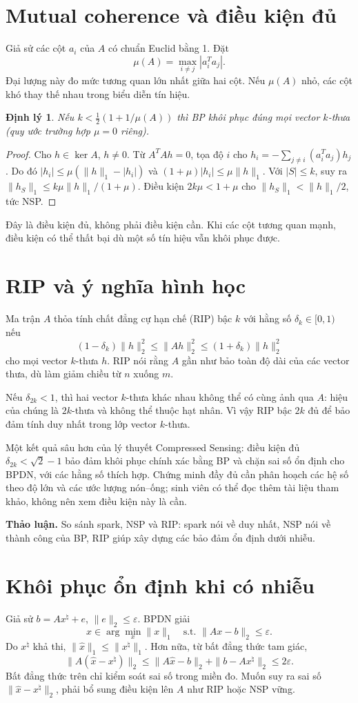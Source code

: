 \documentclass[12pt,a4paper]{article}
\newtheorem{theorem}{Định lý}[section]\newtheorem{lemma}[theorem]{Bổ đề}
\begin{document}
\section{Mutual coherence và điều kiện đủ}
Giả sử các cột $a_i$ của $A$ có chuẩn Euclid bằng 1. Đặt
\[\mu(A)=\max_{i\ne j}|a_i^Ta_j|.\]
Đại lượng này đo mức tương quan lớn nhất giữa hai cột. Nếu $\mu(A)$ nhỏ, các cột khó thay thế nhau trong biểu diễn tín hiệu.

\begin{theorem}Nếu $k<\frac12(1+1/\mu(A))$ thì BP khôi phục đúng mọi vector $k$-thưa (quy ước trường hợp $\mu=0$ riêng).\end{theorem}
\begin{proof}Cho $h\in\ker A$, $h\ne0$. Từ $A^TAh=0$, tọa độ $i$ cho $h_i=-\sum_{j\ne i}(a_i^Ta_j)h_j$. Do đó $|h_i|\le\mu(\|h\|_1-|h_i|)$ và $(1+\mu)|h_i|\le\mu\|h\|_1$. Với $|S|\le k$, suy ra $\|h_S\|_1\le k\mu\|h\|_1/(1+\mu)$. Điều kiện $2k\mu<1+\mu$ cho $\|h_S\|_1<\|h\|_1/2$, tức NSP.\end{proof}

Đây là điều kiện đủ, không phải điều kiện cần. Khi các cột tương quan mạnh, điều kiện có thể thất bại dù một số tín hiệu vẫn khôi phục được.
\clearpage
\section{RIP và ý nghĩa hình học}
Ma trận $A$ thỏa tính chất đẳng cự hạn chế (RIP) bậc $k$ với hằng số $\delta_k\in[0,1)$ nếu
\[(1-\delta_k)\|h\|_2^2\le\|Ah\|_2^2\le(1+\delta_k)\|h\|_2^2\]
cho mọi vector $k$-thưa $h$. RIP nói rằng $A$ gần như bảo toàn độ dài của các vector thưa, dù làm giảm chiều từ $n$ xuống $m$.

Nếu $\delta_{2k}<1$, thì hai vector $k$-thưa khác nhau không thể có cùng ảnh qua $A$: hiệu của chúng là $2k$-thưa và không thể thuộc hạt nhân. Vì vậy RIP bậc $2k$ đủ để bảo đảm tính duy nhất trong lớp vector $k$-thưa.

Một kết quả sâu hơn của lý thuyết Compressed Sensing: điều kiện đủ $\delta_{2k}<\sqrt2-1$ bảo đảm khôi phục chính xác bằng BP và chặn sai số ổn định cho BPDN, với các hằng số thích hợp. Chứng minh đầy đủ cần phân hoạch các hệ số theo độ lớn và các ước lượng nón--ống; sinh viên có thể đọc thêm tài liệu tham khảo, không nên xem điều kiện này là cần.

\textbf{Thảo luận.} So sánh spark, NSP và RIP: spark nói về duy nhất, NSP nói về thành công của BP, RIP giúp xây dựng các bảo đảm ổn định dưới nhiễu.
\clearpage
\section{Khôi phục ổn định khi có nhiễu}
Giả sử $b=Ax^\natural+e$, $\|e\|_2\le\varepsilon$. BPDN giải
\[\widehat x\in\arg\min_x\|x\|_1\quad\text{s.t. }\|Ax-b\|_2\le\varepsilon.\]
Do $x^\natural$ khả thi, $\|\widehat x\|_1\le\|x^\natural\|_1$. Hơn nữa, từ bất đẳng thức tam giác,
\[\|A(\widehat x-x^\natural)\|_2\le\|A\widehat x-b\|_2+\|b-Ax^\natural\|_2\le2\varepsilon.\]
Bất đẳng thức trên chỉ kiểm soát sai số trong miền đo. Muốn suy ra sai số $\|\widehat x-x^\natural\|_2$, phải bổ sung điều kiện lên $A$ như RIP hoặc NSP vững.
\end{document}
